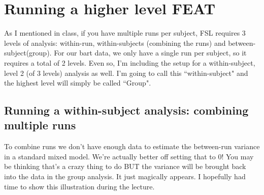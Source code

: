 \documentclass[titlepage,12pt] {article}
\begin{document}
\section*{Running a higher level FEAT}
As I mentioned in class, if you have multiple runs per subject, FSL requires 3 levels of analysis: within-run, within-subjects (combining the runs) and between-subject(group).  For our bart data, we only have a single run per subject, so it requires a total of 2 levels.  Even so, I'm including the setup for a within-subject, level 2 (of 3 levels) analysis as well.  I'm going to call this ``within-subject" and the highest level will simply be called ``Group".

\subsection*{Running a within-subject analysis: combining multiple runs}
To combine runs we don't have enough data to estimate the between-run variance in a standard mixed model.  We're actually better off setting that to 0!  You may be thinking that's a crazy thing to do BUT the variance will be brought back into the data in the group analysis.  It just magically appears.  I hopefully had time to show this illustration during the lecture.
\end{document}
